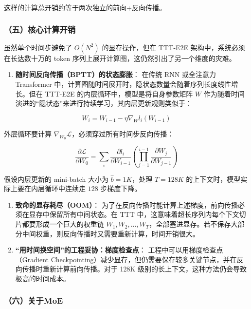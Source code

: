 这样的计算总开销约等于两次独立的前向+反向传播。

\hypertarget{ux4e94ux6838ux5fc3ux8ba1ux7b97ux5f00ux9500}{%
\subsubsection{（五）核心计算开销}\label{ux4e94ux6838ux5fc3ux8ba1ux7b97ux5f00ux9500}}

虽然单个时间步避免了 \(O(N^2)\) 的显存操作，但在 TTT-E2E 架构中，系统必须在长达数十万的 token 序列上展开计算图，这仍然引出了另一个维度的灾难。

\begin{enumerate}
\def\labelenumi{\arabic{enumi}.}
\tightlist
\item
  \textbf{随时间反向传播（BPTT）的状态膨胀}：
  在传统 RNN 或全注意力 Transformer 中，计算图随时间展开时，隐状态数量会随着序列长度线性增长。但在 TTT-E2E 的内层循环中，模型是将自身参数矩阵 \(W\) 作为随着时间演进的``隐状态''来进行持续学习，其内层更新规则类似于：
\end{enumerate}

\[
W_i = W_{i-1} - \eta\nabla_W l_i(W_{i-1})
\]

外层循环要计算 \(\nabla_{W_0}\mathcal{L}\)，必须穿过所有时间步反向传播：

\[
\frac{\partial\mathcal{L}}{\partial W_0}
=
\sum_i
\frac{\partial l_i}{\partial W_{i-1}}
\left(
\prod_{j=1}^{i-1}
\frac{\partial W_j}{\partial W_{j-1}}
\right)
\]

假设内层更新的 mini-batch 大小为 \(\hat b=1K\)，处理 \(T=128K\) 的上下文时，模型实际上要在内层循环中连续走 \(128\) 步梯度下降。

\begin{enumerate}
\def\labelenumi{\arabic{enumi}.}
\setcounter{enumi}{1}
\item
  \textbf{致命的显存耗尽（OOM）}：
  为了在反向传播时能计算上述梯度，前向传播必须在显存中保留所有中间状态。在 TTT 中，这意味着超长序列内每个下文切片都要形成一个巨大的权重链 \(W_1,W_2,\ldots,W_T\)，全部塞进显存。若不保存大部分中间权重，则反向传播时又需要重新计算，时间开销很大。
\item
  \textbf{``用时间换空间''的工程妥协：梯度检查点}：
  工程中可以用梯度检查点（Gradient Checkpointing）减少显存，但仍需要保存较多关键节点，并在反向传播时重新计算前向传播。对于 128K 级别的长上下文，这种方法仍会导致极高的时间成本。
\end{enumerate}

\hypertarget{ux516dux5173ux4e8emoe}{%
\subsubsection{（六）关于MoE}\label{ux516dux5173ux4e8emoe}}

